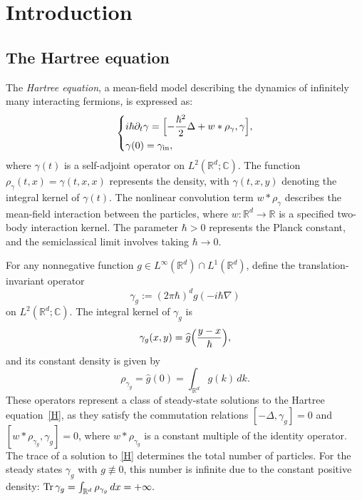 \documentclass[JEP,XML,SOM,Unicode]{cedram}
\newenvironment{mycases}
{\begin{dcases*}}
{\end{dcases*}}
\theoremstyle{plain}
\theoremstyle{remark}
\newcommand{\Bbr}[1]{\Bigl(#1 \Bigr)}
\newcommand{\sBbr}[1]{\Bigl[#1\Bigr]}
\newcommand{\p}{\partial}
\newcommand{\R}{\mathbb{R}}
\newcommand{\C}{\mathbb{C}}
\begin{document}
\maketitle
\vspace*{-2\baselineskip}
\tableofcontents
\mainmatter

\vspace*{-3\baselineskip}
\mbox{}
\section{Introduction}

\subsection{The Hartree equation}

The \textit{Hartree equation}, a mean-field model describing the dynamics of infinitely many interacting fermions, is expressed as:\vspace{-3pt}
\begin{align}\label{H}
\begin{mycases}
i \hbar\p_t\gamma = \sBbr{-\frac{\hbar^2}{2}\Delta + w*\rho_{\gamma}, \gamma}, \\
\gamma(0) = \gamma_{\mathrm{in}},
\end{mycases}
\end{align}
where $\gamma(t)$ is a self-adjoint operator on $L^2(\R^d; \C)$. The function $\rho_{\gamma}(t,x) = \gamma(t,x,x)$ represents the density, with $\gamma(t,x,y)$ denoting the integral kernel of $\gamma(t)$. The nonlinear convolution term $w*\rho_\gamma$ describes the mean-field interaction between the particles, where $w\colon \R^d \to \R$ is a specified two-body interaction kernel. The parameter \(\hbar>0\) represents the Planck constant, and the semiclassical limit involves taking \(\hbar \to 0\).

For any nonnegative function $g\in L^\infty(\R^d)\cap L^1(\R^d)$, define the translation-invariant operator
\[
\gamma_g := (2\pi\hbar)^d g(-i\hbar\nabla)
\]
on \( L^2(\R^d; \C) \). The integral kernel of \(\gamma_g\) is
\[
\gamma_g(x,y) = \widehat g\Bbr{\frac{y-x}{\hbar}},
\]
and its constant density is given by
\[
\rho_{\gamma_g} = \widehat g(0) = \int_{\R^d} g(k) \,dk.
\]
These operators represent a class of steady-state solutions to the Hartree equation~\eqref{H}, as they satisfy the commutation relations \([-\Delta, \gamma_g] = 0\) and $[w*\rho_{\gamma_g}, \gamma_g]=0$, where $w*\rho_{\gamma_g}$ is a constant multiple of the identity operator. The trace of a solution to \eqref{H} determines the total number of particles. For the steady states \(\gamma_g\) with \(g\not\equiv0\), this number is infinite due to the constant positive density: \(\Tr\gamma_g = \int_{\R^d} \rho_{\gamma_g} \,dx = +\infty.\)
\end{document}
